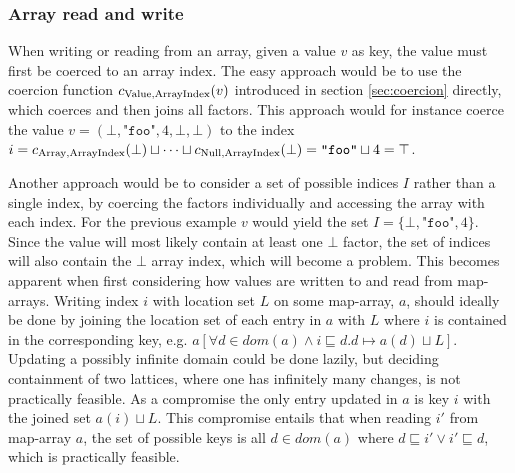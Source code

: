 \subsubsection{Array read and write}
When writing or reading from an array, given a value $v$ as key, the value must first be coerced to an array index. The easy approach would be to use the coercion function $c_{\text{Value}, \text{ArrayIndex}}(v)$ introduced in section \ref{sec:coercion} directly, which coerces and then joins all factors. This approach would for instance coerce the value $v = (\bot, \texttt{"foo"}, 4, \bot, \bot)$ to the index $i = c_{\text{Array}, \text{ArrayIndex}}(\bot)\sqcup\cdots\sqcup c_{\text{Null}, \text{ArrayIndex}}(\bot) = \texttt{"foo"} \sqcup 4 = \top $. 

Another approach would be to consider a set of possible indices $I$ rather than a single index, by coercing the factors individually and accessing the array with each index. For the previous example $v$ would yield the set $I = \{\bot, \texttt{"foo"}, 4\}$. Since the value will most likely contain at least one $\bot$ factor, the set of indices will also contain the $\bot$ array index, which will become a problem. This becomes apparent when first considering how values are written to and read from map-arrays. Writing index $i$ with location set $L$ on some map-array, $a$, should ideally be done by joining the location set of each entry in $a$ with $L$ where $i$ is contained in the corresponding key, e.g. $a[\forall d \in dom(a)\wedge i \sqsubseteq d. d \mapsto a(d)\sqcup L]$. Updating a possibly infinite domain could be done lazily, but deciding containment of two lattices, where one has infinitely many changes, is not practically feasible. As a compromise the only entry updated in $a$ is key $i$ with the joined set $a(i)\sqcup L$. This compromise entails that when reading $i'$ from map-array $a$, the set of possible keys is all $d\in dom(a)$ where $d\sqsubseteq i' \vee i'\sqsubseteq d$, which is practically feasible. 

